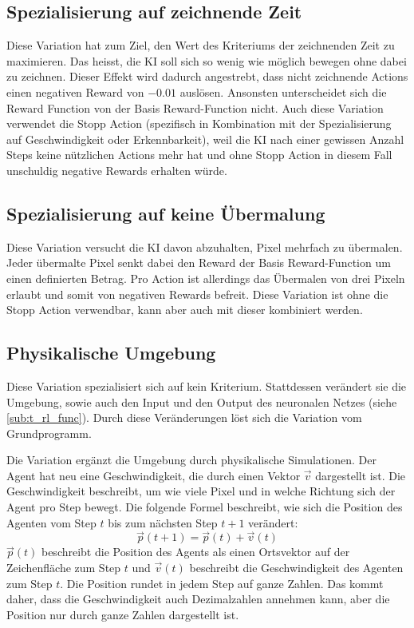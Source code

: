 \subsection{Spezialisierung auf zeichnende Zeit}\label{sub:m_var_penlift}
Diese Variation hat zum Ziel, den Wert des Kriteriums der zeichnenden Zeit zu
maximieren. Das heisst, die KI soll sich so wenig wie möglich bewegen ohne dabei
zu zeichnen. Dieser Effekt wird dadurch angestrebt, dass nicht zeichnende
Actions einen negativen Reward von $-0.01$ auslösen. Ansonsten unterscheidet
sich die Reward Function von der Basis Reward-Function nicht. Auch diese
Variation verwendet die Stopp Action (spezifisch in Kombination mit der
Spezialisierung auf Geschwindigkeit oder Erkennbarkeit), weil die KI nach einer
gewissen Anzahl Steps keine nützlichen Actions mehr hat und ohne Stopp Action in
diesem Fall unschuldig negative Rewards erhalten würde.

\subsection{Spezialisierung auf keine Übermalung}\label{sub:m_var_overdraw}
Diese Variation versucht die KI davon abzuhalten, Pixel mehrfach zu übermalen.
Jeder übermalte Pixel senkt dabei den Reward der Basis Reward-Function um einen
definierten Betrag. Pro Action ist allerdings das Übermalen von drei Pixeln
erlaubt und somit von negativen Rewards befreit. Diese Variation ist ohne
die Stopp Action verwendbar, kann aber auch mit dieser kombiniert werden.

\subsection{Physikalische Umgebung}\label{sub:m_var_phy} Diese Variation
spezialisiert sich auf kein Kriterium. Stattdessen verändert sie die Umgebung,
sowie auch den Input und den Output des neuronalen Netzes (siehe
\ref{sub:t_rl_func}). Durch diese Veränderungen löst sich die Variation vom
Grundprogramm.
 
Die Variation ergänzt die Umgebung durch physikalische Simulationen. Der Agent
hat neu eine Geschwindigkeit, die durch einen Vektor $\vec{v}$ dargestellt ist.
Die Geschwindigkeit beschreibt, um wie viele Pixel und in welche Richtung sich
der Agent pro Step bewegt. Die folgende Formel beschreibt, wie sich die Position
des Agenten vom Step $t$ bis zum nächsten Step $t+1$ verändert:
\[ \vec{p}(t+1) = \vec{p}(t) + \vec{v}(t) \]
$\vec{p}(t)$ beschreibt die Position des Agents als einen Ortsvektor auf der
Zeichenfläche zum Step $t$ und $\vec{v}(t)$ beschreibt die Geschwindigkeit des
Agenten zum Step $t$. Die Position rundet in jedem Step auf ganze Zahlen. Das
kommt daher, dass die Geschwindigkeit auch Dezimalzahlen annehmen kann, aber die
Position nur durch ganze Zahlen dargestellt ist.
 
